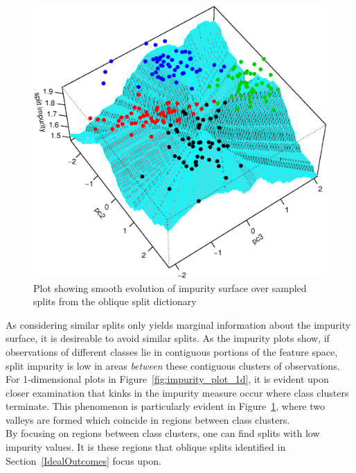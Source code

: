 \begin{figure}
\centering
\includegraphics[width=.99\textwidth]{impurity_plot_2d_crabs_data_detail_100_bb.ps}
\caption{Plot showing smooth evolution of impurity surface over sampled splits from the oblique split dictionary}
\label{fig:impurity_plot_2d}
\end{figure}

As considering similar splits only yields marginal information about the impurity surface, it is desireable to avoid similar splits. As the impurity plots show, if observations of different classes lie in contiguous portions of the feature space, split impurity is low in areas \emph{between} these contiguous clusters of observations. For 1-dimensional plots in Figure~\ref{fig:impurity_plot_1d}, it is evident upon closer examination that kinks in the impurity measure occur where class clusters terminate. This phenomenon is particularly evident in Figure~\ref{fig:impurity_plot_2d}, where two valleys are formed which coincide in regions between class clusters. \\

By focusing on regions between class clusters, one can find splits with low impurity values. It is these regions that oblique splits identified in Section~\ref{IdealOutcomes} focus upon.

